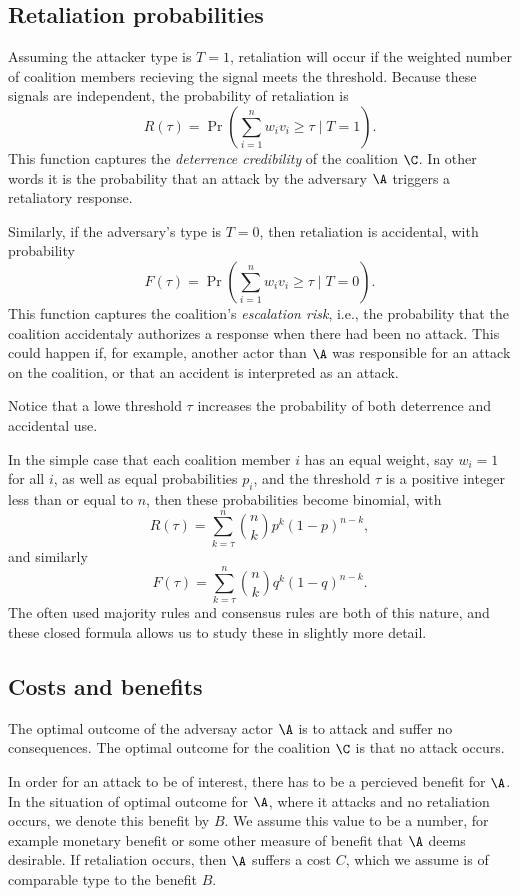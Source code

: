 \subsection{Retaliation probabilities}

Assuming the attacker type is $T=1$, retaliation will occur if the weighted number of coalition members recieving the signal meets the threshold. Because these signals are independent, the probability of retaliation is 
\[R(\tau) = \Pr\left(\sum_{i=1}^n w_i v_i \geq \tau \mid T=1\right).\]
This function captures the \emph{deterrence credibility} of the coalition $\C$. In other words it is the probability that an attack by the adversary $\A$ triggers a retaliatory response. 

Similarly, if the adversary's type is $T=0$, then retaliation is accidental, with probability 
\[F(\tau) = \Pr\left(\sum_{i=1}^n w_i v_i \geq \tau \mid T=0\right).\]
This function captures the coalition's \emph{escalation risk}, i.e., the probability that the coalition accidentaly authorizes a response when there had been no attack. This could happen if, for example, another actor than $\A$ was responsible for an attack on the coalition, or that an accident is interpreted as an attack. 

Notice that a lowe threshold $\tau$ increases the probability of both deterrence and accidental use. 

In the simple case that each coalition member $i$ has an equal weight, say $w_i = 1$ for all $i$, as well as equal probabilities $p_i$, and the threshold $\tau$ is a positive integer less than or equal to $n$, then these probabilities become binomial, with 
\[R(\tau) = \sum_{k=\tau}^{n} \binom{n}{k} p^{k} (1-p)^{n-k},\]
and similarly 
\[F(\tau) = \sum_{k=\tau}^{n} \binom{n}{k} q^{k} (1-q)^{n-k}.
\]
The often used majority rules and consensus rules are both of this nature, and these closed formula allows us to study these in slightly more detail. 

\subsection{Costs and benefits}

The optimal outcome of the adversay actor $\A$ is to attack and suffer no consequences. The optimal outcome for the coalition $\C$ is that no attack occurs. 

In order for an attack to be of interest, there has to be a percieved benefit for $\A$. In the situation of optimal outcome for $\A$, where it attacks and no retaliation occurs, we denote this benefit by $B$. We assume this value to be a number, for example monetary benefit or some other measure of benefit that $\A$ deems desirable. If retaliation occurs, then $\A$ suffers a cost $C$, which we assume is of comparable type to the benefit $B$. 

